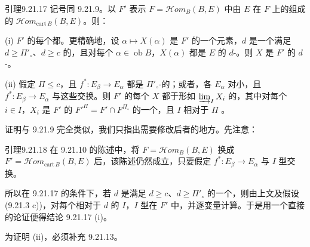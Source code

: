 \begin{SGAresult}{引理}{9.21.17}
记号同 9.21.9。以 $F'$ 表示 $F=\mathscr{H}om_B(B,E)$ 中由 $E$ 在 $F$ 上的组成的 $\mathscr{H}om_{\mathrm{cart}\,B}(B,E)$。则：

(i) $F'$ 的每个都。更精确地，设 $\alpha\mapsto X(\alpha)$ 是 $F'$ 的一个元素，$d$ 是一个满足 $d\geq\Pi'_\circ$、$d\geq c$ 的，且对每个 $\alpha\in\operatorname{ob}B$，$X(\alpha)$ 都是 $E$ 的 $d$-。则 $X$ 是 $F'$ 的 $d$-。

(ii) 假定 $\Pi\leq c$，且 $f^*:E_\beta\to E_\alpha$ 都是 $\Pi'_\circ$-的；或者，各 $E_\alpha$ 对小，且 $f^*:E_\beta\to E_\alpha$ 与这些交换。则 $F'$ 的每个 $X$ 都于形如 $\varinjlim_I X_i$ 的，其中对每个 $i\in I$，$X_i$ 是 $F'$ 的 $F'^\Pi=F'\cap F^{\Pi_\circ}$ 的一个，且 $I$ 相对于 $\Pi$ 。
\end{SGAresult}

证明与 9.21.9 完全类似，我们只指出需要修改后者的地方。先注意：

\begin{SGAresult}{引理}{9.21.18}
在 9.21.10 的陈述中，将 $F=\mathscr{H}om_B(B,E)$ 换成 $F'=\mathscr{H}om_{\mathrm{cart}\,B}(B,E)$ 后，该陈述仍然成立，只要假定 $f^*:E_\beta\to E_\alpha$ 与 $I$ 型交换。
\end{SGAresult}

所以在 9.21.17 的条件下，若 $d$ 是满足 $d\geq c$、$d\geq\Pi'_\circ$ 的一个，则由上文及假设 (9.21.3 c))，对每个相对于 $d$  的 $I$，$I$ 型在 $F'$ 中，并逐变量计算。于是用一个直接的论证便得结论 9.21.17 (i)。

为证明 (ii)，必须补充 9.21.13。

